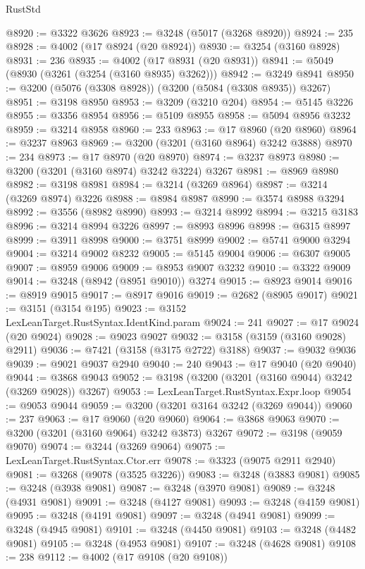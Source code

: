 \begin{lexlean}{RustStd}
\begin{coremodule}
{\begin{coremodule}
{{{{{{{{{{{{{{{{{{{{{{{{{@8920 := @3322 @3626
@8923 := @3248 (@5017 (@3268 @8920))
@8924 := 235
@8928 := @4002 (@17 @8924 (@20 @8924))
@8930 := @3254 (@3160 @8928)
@8931 := 236
@8935 := @4002 (@17 @8931 (@20 @8931))
@8941 := @5049 (@8930 (@3261 (@3254 (@3160 @8935) @3262)))
@8942 := @3249 @8941
@8950 := @3200 (@5076 (@3308 @8928)) (@3200 (@5084 (@3308 @8935)) @3267)
@8951 := @3198 @8950
@8953 := @3209 (@3210 @204)
@8954 := @5145 @3226
@8955 := @3356 @8954
@8956 := @5109 @8955
@8958 := @5094 @8956 @3232
@8959 := @3214 @8958
@8960 := 233
@8963 := @17 @8960 (@20 @8960)
@8964 := @3237 @8963
@8969 := @3200 (@3201 (@3160 @8964) @3242 @3888)
@8970 := 234
@8973 := @17 @8970 (@20 @8970)
@8974 := @3237 @8973
@8980 := @3200 (@3201 (@3160 @8974) @3242 @3224) @3267
@8981 := @8969 @8980
@8982 := @3198 @8981
@8984 := @3214 (@3269 @8964)
@8987 := @3214 (@3269 @8974) @3226
@8988 := @8984 @8987
@8990 := @3574 @8988 @3294
@8992 := @3556 (@8982 @8990)
@8993 := @3214 @8992
@8994 := @3215 @3183
@8996 := @3214 @8994 @3226
@8997 := @8993 @8996
@8998 := @6315 @8997
@8999 := @3911 @8998
@9000 := @3751 @8999
@9002 := @5741 @9000 @3294
@9004 := @3214 @9002 @8232
@9005 := @5145 @9004
@9006 := @6307 @9005
@9007 := @8959 @9006
@9009 := @8953 @9007 @3232
@9010 := @3322 @9009
@9014 := @3248 (@8942 (@8951 @9010)) @3274
@9015 := @8923 @9014
@9016 := @8919 @9015
@9017 := @8917 @9016
@9019 := @2682 (@8905 @9017)
@9021 := @3151 (@3154 @195)
@9023 := @3152 LexLeanTarget.RustSyntax.IdentKind.param
@9024 := 241
@9027 := @17 @9024 (@20 @9024)
@9028 := @9023 @9027
@9032 := @3158 (@3159 (@3160 @9028) @2911)
@9036 := @7421 (@3158 (@3175 @2722) @3188)
@9037 := @9032 @9036
@9039 := @9021 @9037 @2940
@9040 := 240
@9043 := @17 @9040 (@20 @9040)
@9044 := @3868 @9043
@9052 := @3198 (@3200 (@3201 (@3160 @9044) @3242 (@3269 @9028)) @3267)
@9053 := LexLeanTarget.RustSyntax.Expr.loop
@9054 := @9053 @9044
@9059 := @3200 (@3201 @3164 @3242 (@3269 @9044))
@9060 := 237
@9063 := @17 @9060 (@20 @9060)
@9064 := @3868 @9063
@9070 := @3200 (@3201 (@3160 @9064) @3242 @3873) @3267
@9072 := @3198 (@9059 @9070)
@9074 := @3244 (@3269 @9064)
@9075 := LexLeanTarget.RustSyntax.Ctor.err
@9078 := @3323 (@9075 @2911 @2940)
@9081 := @3268 (@9078 (@3525 @3226))
@9083 := @3248 (@3883 @9081)
@9085 := @3248 (@3938 @9081)
@9087 := @3248 (@3970 @9081)
@9089 := @3248 (@4931 @9081)
@9091 := @3248 (@4127 @9081)
@9093 := @3248 (@4159 @9081)
@9095 := @3248 (@4191 @9081)
@9097 := @3248 (@4941 @9081)
@9099 := @3248 (@4945 @9081)
@9101 := @3248 (@4450 @9081)
@9103 := @3248 (@4482 @9081)
@9105 := @3248 (@4953 @9081)
@9107 := @3248 (@4628 @9081)
@9108 := 238
@9112 := @4002 (@17 @9108 (@20 @9108))
}}}}}}}}}}}}}}}}}}}}}}}}}
\end{coremodule}}
\end{coremodule}
\end{lexlean}
